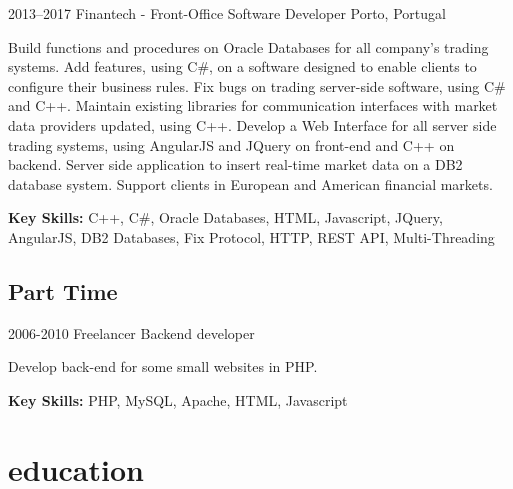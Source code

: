 \documentclass[]{friggeri-cv} %
\begin{document}
\pagebreak

\begin{entrylist}

\entry
    {2013--2017}
    {Finantech - Front-Office}
    {Software Developer}
    {Porto, Portugal}
    {
        Build functions and procedures on Oracle Databases for all company's trading systems. Add features, using C\#, on a software designed to enable clients to configure their business rules. Fix bugs on trading server-side software, using C\# and C++. Maintain existing libraries for communication interfaces with market data providers updated, using C++. Develop a Web Interface for all server side trading systems, using AngularJS and JQuery on front-end and C++ on backend. Server side application to insert real-time market data on a DB2 database system. Support clients in European and American financial markets. 

        \textbf{Key Skills: }
        C++, C\#, Oracle Databases, HTML, Javascript, JQuery, AngularJS, DB2 Databases, Fix Protocol, HTTP, REST API, Multi-Threading
    }


\end{entrylist}


\subsection{Part Time}

\begin{entrylist}

\entry
{2006-2010}
{Freelancer}
    {Backend developer}
{}
{
Develop back-end for some small websites in PHP.  

\textbf{Key Skills: }
PHP, MySQL, Apache, HTML, Javascript
}

\end{entrylist}


\section{education}
\end{document}
